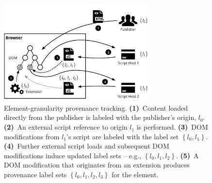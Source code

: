 \begin{figure}[t]
    \centering
    \includegraphics[width=0.7\textwidth]{adinjection/figures/provenance.pdf}
    \caption{Element-granularity provenance tracking.
        \textbf{(1)}~Content loaded directly from the publisher is labeled
        with the publisher's origin, \(l_0\).
        \textbf{(2)}~An external script reference to origin \(l_1\) is performed.
        \textbf{(3)}~DOM modifications from \(l_1\)'s script are labeled with
        the label set \(\left\{l_0,l_1\right\}\).
        \textbf{(4)}~Further external script loads and subsequent DOM
        modifications induce updated label sets -- e.g.,
        \(\left\{l_0,l_1,l_2\right\}\).
        \textbf{(5)}~A DOM modification that originates from an extension
        produces provenance label sets \(\left\{l_0, l_1, l_2, l_3\right\}\) for
        the element.}
    \label{adinjection:fig:provenance}
\end{figure}
